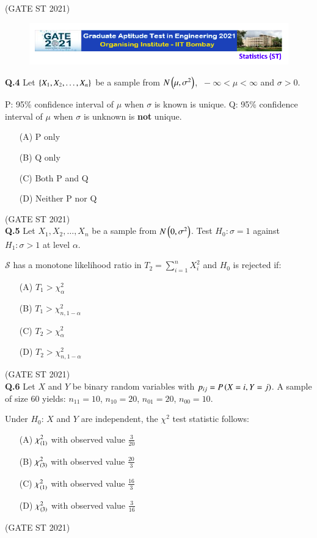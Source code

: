 \documentclass[journal,12pt,onecolumn]{IEEEtran}
\theoremstyle{remark}
\begin{document}
\hfill (GATE ST 2021) \\


\begin{figure}
 \centering
    \includegraphics[width=1\linewidth]{figs/0.png} 
\end{figure}
\textbf{Q.4}
Let $\left\{ X_1, X_2, \dots, X_n \right\}$ be a sample from $N\left(\mu,\sigma^2\right)$, $\ -\infty < \mu < \infty$ and $\sigma > 0$.

P: 95\% confidence interval of $\mu$ when $\sigma$ is known is unique.  
Q: 95\% confidence interval of $\mu$ when $\sigma$ is unknown is \textbf{not} unique.

\begin{enumerate}
\item[(A)] P only
\item[(B)] Q only
\item[(C)] Both P and Q
\item[(D)] Neither P nor Q
\end{enumerate}
\hfill (GATE ST 2021) \\


\textbf{Q.5}
Let $X_1, X_2, \dots, X_n$ be a sample from $N\left(0,\sigma^2\right)$.  
Test $H_0: \sigma = 1$ against $H_1: \sigma > 1$ at level $\alpha$.

$\mathcal{S}$ has a monotone likelihood ratio in $T_2 = \sum_{i=1}^n X_i^2$ and $H_0$ is rejected if:
\begin{enumerate}
\item[(A)] $T_1 > \chi_\alpha^2$
\item[(B)] $T_1 > \chi_{n,1-\alpha}^2$
\item[(C)] $T_2 > \chi_\alpha^2$
\item[(D)] $T_2 > \chi_{n,1-\alpha}^2$
\end{enumerate}
\hfill (GATE ST 2021) \\


\textbf{Q.6}
Let $X$ and $Y$ be binary random variables with $p_{ij} = P\left(X = i, Y = j\right)$.  
A sample of size $60$ yields: $n_{11} = 10$, $n_{10} = 20$, $n_{01} = 20$, $n_{00} = 10$.

Under $H_0$: $X$ and $Y$ are independent, the $\chi^2$ test statistic follows:

\begin{enumerate}
\item[(A)] $\chi^2_{\left(1\right)}$ with observed value $\frac{3}{20}$
\item[(B)] $\chi^2_{\left(3\right)}$ with observed value $\frac{20}{3}$
\item[(C)] $\chi^2_{\left(1\right)}$ with observed value $\frac{16}{3}$
\item[(D)] $\chi^2_{\left(3\right)}$ with observed value $\frac{3}{16}$
\end{enumerate}
\hfill (GATE ST 2021) \\
\end{document}
